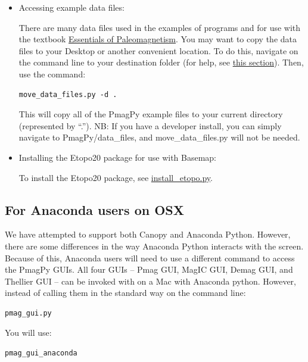 \documentclass[11pt]{book}
\begin{document}
{\begin{itemize}
If you don't see the Pmag GUI window, make sure you have followed all the install directions correctly, and check the \href{#trouble}{Trouble Shooting} section.  If you are stumped, please create a \href{https://github.com/PmagPy/PmagPy/issues}{Github issue}.

\item Accessing example data files:

   There are many data files used in the examples of programs and for use with the textbook  \href{http://earthref.org/MAGIC/books/Tauxe/Essentials/WebBook3.html}{Essentials of Paleomagnetism}.     You may want to copy  the data files to your Desktop or another convenient location.
   To do this, navigate on the command line to your destination folder (for help, see \href{#file_system}{this section}).  Then, use the command: \begin{verbatim}move_data_files.py -d .\end{verbatim} This will copy all of the PmagPy example files to your current directory (represented by ``.'').  NB: If you have a developer install, you can simply navigate to PmagPy/data_files, and move\_data\_files.py will not be needed.

\item Installing the Etopo20 package for use with Basemap:

To install the Etopo20 package, see \href{#install_etopo.py}{install\_etopo.py}.

   \end{itemize}


    \subsection {For Anaconda users on OSX}
    We have attempted to support both Canopy and Anaconda Python.  However, there are some differences in the way Anaconda Python interacts with the screen. Because of this, Anaconda users will need to use a different command to access the PmagPy GUIs.  All four GUIs -- Pmag GUI, MagIC GUI, Demag GUI, and Thellier GUI -- can be invoked with on a Mac with Anaconda python.  However, instead of calling them in the standard way on the command line:

\begin{verbatim}
pmag_gui.py
\end{verbatim}

You will use:

\begin{verbatim}
pmag_gui_anaconda
\end{verbatim}

}
\end{document}

